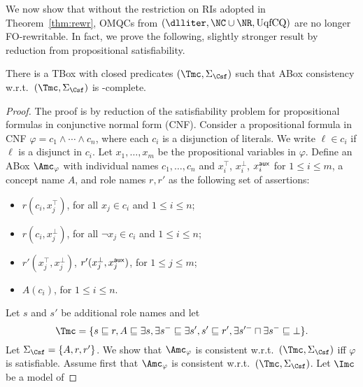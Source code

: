 \documentclass{lmcs}
\theoremstyle{definition}
\begin{document}
We now show that without the restriction on RIs adopted in
Theorem~\ref{thm:rewr}, OMQCs from $(\dlliter,\NC \cup
\NR,\text{UqfCQ})$ are no longer FO-rewritable. In fact, we prove the
following, slightly stronger result by reduction from propositional
satisfiability.
%
\begin{thm}
  \label{thm:nphard} There is a \dlliter TBox with closed predicates $(\Tmc,\Sigma_{\Csf})$ 
  such that ABox consistency w.r.t.\ $(\Tmc,\Sigma_{\Csf})$ is \np-complete.
\end{thm}
\begin{proof}
  The proof is by reduction of the satisfiability problem for
  propositional formulas in conjunctive normal form (CNF).  Consider a
  propositional formula in CNF $\varphi=c_{1} \wedge \cdots \wedge
  c_{n}$, where each $c_{i}$ is a disjunction of literals. We write
  $\ell\in c_{i}$ if $\ell$ is a disjunct in $c_{i}$.
  Let $x_{1},\ldots, x_{m}$ be the propositional variables in
  $\varphi$.  Define an ABox $\Amc_{\varphi}$ with individual names
  $c_{1},\ldots,c_{n}$ and $x_{i}^\top$, $x_{i}^{\bot}$, $x_{i}^{{\sf
      aux}}$ for $1\leq i \leq m$, a concept name $A$, and role names
  $r,r'$ as the following set of assertions:
  \begin{itemize}
  \item $r(c_{i},x_{j}^{\top})$, for all $x_{j}\in c_{i}$ and $1\leq i
    \leq n$;
  \item $r(c_{i},x_{j}^{\bot})$, for all $\neg x_{j}\in c_{i}$ and
    $1\leq i \leq n$;
  \item $r'(x_{j}^{\top},x_{j}^{\bot})$, $r'(x_{j}^{\bot},x_{j}^{{\sf
        aux}})$, for $1\leq j \leq m$;
  \item $A(c_{i})$, for $1\leq i \leq n$.
  \end{itemize}
  Let $s$ and $s'$ be additional role names and let 
$$
\Tmc = \{s \sqsubseteq r, A \sqsubseteq \exists s, \exists s^{-} \sqsubseteq \exists s', s' \sqsubseteq r',
  \exists s'^{-} \sqcap \exists s^{-} \sqsubseteq \bot\}.
$$
  Let $\Sigma_{\Csf} = \{A,r,r'\}$. We show that $\Amc_{\varphi}$ is
  consistent w.r.t.~$(\Tmc,\Sigma_{\Csf})$ iff $\varphi$ is
  satisfiable.  Assume first that $\Amc_{\varphi}$ is consistent
  w.r.t.~$(\Tmc,\Sigma_{\Csf})$. Let $\Imc$ be a model of

\end{proof}
\end{document}

